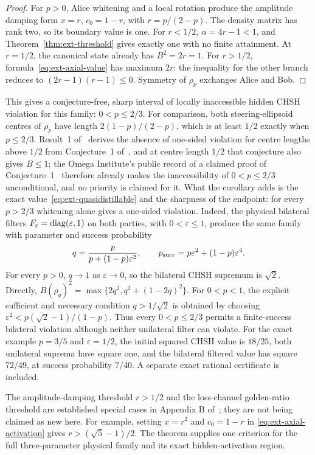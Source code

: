 \begin{proof}
For $p>0$, Alice whitening and a local rotation produce the amplitude
damping form $x=r$, $c_0=1-r$, with $r=p/(2-p)$.
The density matrix has rank two, so its boundary value is one.
For $r<1/2$, $\alpha=4r-1<1$, and
Theorem~\ref{thm:ext-threshold} gives exactly one with no finite
attainment. At $r=1/2$, the canonical state already has $B^2=2r=1$.
For $r>1/2$, formula~\eqref{eq:ext-axial-value} has maximum $2r$:
the inequality for the other branch reduces to
$(2r-1)(r-1)\le0$. Symmetry of $\rho_p$ exchanges Alice and Bob.
\end{proof}

This gives a conjecture-free, sharp interval of locally inaccessible hidden
CHSH violation for this family: $0<p\le2/3$.
For comparison, both steering-ellipsoid centres of $\rho_p$ have length
$2(1-p)/(2-p)$, which is at least $1/2$ exactly when $p\le2/3$. Result~1
of~\cite{ducuara} derives the absence of one-sided violation for centre
lengths above $1/2$ from Conjecture~1 of~\cite{milne}, and at centre
length $1/2$ that conjecture also gives $B\le1$; the Omega Institute's
public record of a claimed proof of Conjecture~1~\cite{dossier}
therefore already makes the inaccessibility of $0<p\le2/3$
unconditional, and no priority is claimed for it. What the corollary adds
is the exact value~\eqref{eq:ext-quasidistillable} and the sharpness of the
endpoint: for every $p>2/3$ whitening alone gives a one-sided violation. Indeed, the physical bilateral
filters $F_\varepsilon=\operatorname{diag}(\varepsilon,1)$ on both parties, with
$0<\varepsilon\le1$, produce the same family with parameter and success
probability
\[
 q=\frac{p}{p+(1-p)\varepsilon^2},\qquad
 p_{\rm succ}=p\varepsilon^2+(1-p)\varepsilon^4.
\]
For every $p>0$, $q\to1$ as $\varepsilon\to0$, so the bilateral CHSH supremum
is $\sqrt2$. Directly,
$B(\rho_q)^2=\max\{2q^2,q^2+(1-2q)^2\}$.
For $0<p<1$, the explicit sufficient and necessary condition
$q>1/\sqrt2$ is obtained by choosing
$\varepsilon^2<p(\sqrt2-1)/(1-p)$. Thus every $0<p\le2/3$ permits a
finite-success bilateral violation although neither unilateral filter can
violate. For the exact example $p=3/5$ and $\varepsilon=1/2$, the initial
squared CHSH value is $18/25$, both unilateral suprema have square one,
and the bilateral filtered value has square $72/49$, at success probability
$7/40$. A separate exact rational certificate is included.

The amplitude-damping threshold $r>1/2$ and the loss-channel
golden-ratio threshold are established special cases in
Appendix B of~\cite{zhang}; they are not being claimed as new here.
For example, setting $x=r^2$ and $c_0=1-r$ in
\eqref{eq:ext-axial-activation} gives
$r>(\sqrt5-1)/2$. The theorem supplies one criterion for the full
three-parameter physical family and its exact hidden-activation region.
